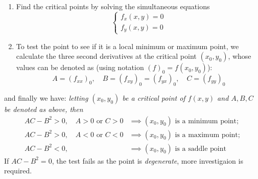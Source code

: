 \documentclass{report}
\begin{document}
\begin{enumerate}
\item Find the critical points by solving the simultaneous equations 
\begin{equation*}
\begin{cases}f_x(x,y)=0\\f_y(x,y)=0\end{cases}
\end{equation*}
\item To test the point to see if it is a local minimum or maximum point, we calculate the three second derivatives
at the critical point $(x_0,y_0)$, whose values can be denoted as (using notation $(f)_0=f(x_0,y_0)$):
\begin{equation*}
A=(f_{xx})_0,\quad B=(f_{xy})_0=(f_{yx})_0,\quad
C=(f_{yy})_0
\end{equation*}
\end{enumerate}
and finally we have: \textit{letting $(x_0,y_0)$ be a critical point of $f(x,y)$ and $A,B,C$ be denoted as above,
then}
\begin{align*}
AC-B^2>0,\quad A>0\text{ or }C>0&\implies
(x_0,y_0)\text{ is a minimum point};\\
AC-B^2>0,\quad A<0\text{ or }C<0&\implies
(x_0,y_0)\text{ is a maximum point};\\
AC-B^2<0,\quad&\implies
(x_0,y_0)\text{ is a saddle point}
\end{align*}
If $AC-B^2=0$, the test fails as the point is \textit{degenerate}, more investigaion is required.
\newpage
\end{document}
